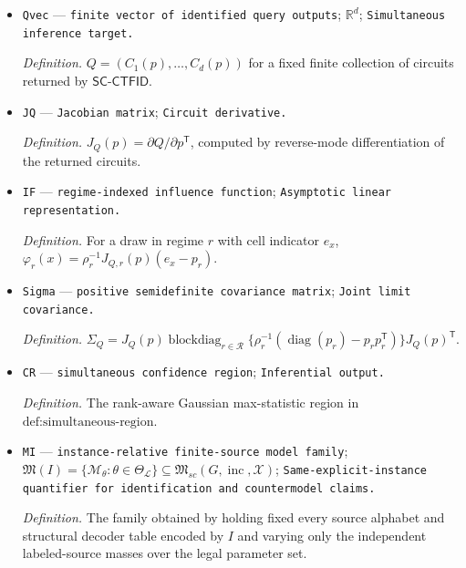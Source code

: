 \documentclass{article}
\begin{document}
\begin{itemize}
  \par\smallskip\noindent\emph{Definition.} The concatenated empirical multinomial proportions \(\widehat p=(\widehat p_r:r\in\mathcal R)\).
  \item \texttt{Qvec} --- \texttt{finite vector of identified query outputs}; \(\mathbb R^d\); \texttt{Simultaneous inference target.}
  \par\smallskip\noindent\emph{Definition.} \(Q=(C_1(p),\ldots,C_d(p))\) for a fixed finite collection of circuits returned by \(\mathsf{SC\mbox{-}CTFID}\).
  \item \texttt{JQ} --- \texttt{Jacobian matrix}; \texttt{Circuit derivative.}
  \par\smallskip\noindent\emph{Definition.} \(J_Q(p)=\partial Q/\partial p^{\mathsf T}\), computed by reverse-mode differentiation of the returned circuits.
  \item \texttt{IF} --- \texttt{regime-\allowbreak{}indexed influence function}; \texttt{Asymptotic linear representation.}
  \par\smallskip\noindent\emph{Definition.} For a draw in regime \(r\) with cell indicator \(e_x\), \(\varphi_r(x)=\rho_r^{-1}J_{Q,r}(p)(e_x-p_r)\).
  \item \texttt{Sigma} --- \texttt{positive semidefinite covariance matrix}; \texttt{Joint limit covariance.}
  \par\smallskip\noindent\emph{Definition.} \(\Sigma_Q=J_Q(p)\operatorname{blockdiag}_{r\in\mathcal R}\{\rho_r^{-1}(\operatorname{diag}(p_r)-p_rp_r^{\mathsf T})\}J_Q(p)^{\mathsf T}\).
  \item \texttt{CR} --- \texttt{simultaneous confidence region}; \texttt{Inferential output.}
  \par\smallskip\noindent\emph{Definition.} The rank-aware Gaussian max-statistic region in \(\text{def:simultaneous-region}\).
  \item \texttt{MI} --- \texttt{instance-\allowbreak{}relative finite-\allowbreak{}source model family}; \(\mathfrak M(I)=\{\mathcal M_\theta:\theta\in\Theta_{\mathcal L}\}\subseteq\mathfrak M_{sc}(G,\operatorname{inc},\mathcal X)\); \texttt{Same-\allowbreak{}explicit-\allowbreak{}instance quantifier for identification and countermodel claims.}
  \par\smallskip\noindent\emph{Definition.} The family obtained by holding fixed every source alphabet and structural decoder table encoded by \(I\) and varying only the independent labeled-source masses over the legal parameter set.
\end{itemize}
\end{document}

